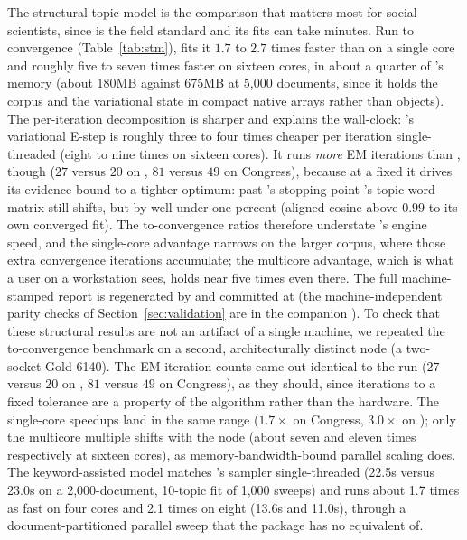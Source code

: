 \documentclass[article]{jss}
\begin{document}
The structural topic model is the comparison that matters most for social
scientists, since   is the field standard and its fits can
take minutes. Run to convergence (Table~\ref{tab:stm}),  fits it
$1.7$ to $2.7$ times faster than   on a single core and
roughly five to seven times faster on sixteen cores, in about a quarter of
 's memory (about 180MB against 675MB at 5{,}000 documents,
since it holds the corpus and the variational state in compact native arrays
rather than  objects). The per-iteration decomposition is sharper and
explains the wall-clock: 's variational E-step is roughly three to four
times cheaper per iteration single-threaded (eight to nine times on sixteen cores).
It runs \emph{more} EM iterations than , though ($27$ versus $20$ on
, $81$ versus $49$ on Congress), because at a fixed  it
drives its evidence bound to a tighter optimum: past 's stopping point
's topic-word matrix still shifts, but by well under one percent
(aligned cosine above $0.99$ to its own converged fit). The to-convergence ratios therefore
understate 's engine speed, and the single-core advantage narrows on the
larger corpus, where those extra convergence iterations accumulate; the multicore
advantage, which is what a user on a workstation sees, holds near five times even there.
The full machine-stamped report is regenerated by  and
committed at  (the
machine-independent parity checks of Section~\ref{sec:validation} are in the
companion ).
To check that these structural results are not an artifact of a single machine, we
repeated the to-convergence benchmark on a second, architecturally distinct node (a
two-socket   Gold 6140). The EM iteration counts came out
identical to the  run ($27$ versus $20$ on , $81$ versus
$49$ on Congress), as they should, since iterations to a fixed tolerance are a
property of the algorithm rather than the hardware. The single-core speedups land in
the same range ($1.7\times$ on Congress, $3.0\times$ on ); only the
multicore multiple shifts with the node (about seven and eleven times respectively at
sixteen cores), as memory-bandwidth-bound parallel scaling does.
The keyword-assisted model matches  's
 sampler single-threaded (22.5s versus 23.0s on a
2{,}000-document, 10-topic fit of 1{,}000 sweeps) and runs about 1.7 times as fast
on four cores and 2.1 times on eight (13.6s and 11.0s), through a
document-partitioned parallel sweep that the  package has no
equivalent of.
\end{document}
